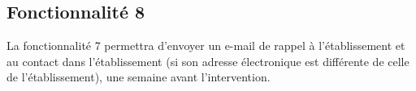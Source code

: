 \subsection{Fonctionnalité 8}
La fonctionnalité 7 permettra d’envoyer un e-mail de rappel à l’établissement et au contact
dans l’établissement (si son adresse électronique est différente de celle de l’établissement),
une semaine avant l’intervention.
